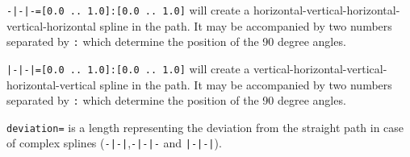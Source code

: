 \documentclass[10pt]{article}
\newenvironment{optionslist}[0]{ 
\begin{list}{}{
	\setlength{\itemindent}{-10pt}
	\setlength{\itemsep}{0pt}
	\setlength{\parsep}{0pt}
}}{\end{list}}
\newcommand\bookmark[1]{\marginpar{\ttfamily #1}}
\begin{document}
\begin{optionslist}
\item \texttt{-|-|-=[0.0 .. 1.0]:[0.0 .. 1.0]} will create a horizontal-vertical-horizontal-vertical-horizontal spline in the path. It may be accompanied by two numbers  separated by \texttt{:} which determine the position of the 90 degree angles.
\item \texttt{|-|-|=[0.0 .. 1.0]:[0.0 .. 1.0]} will create a vertical-horizontal-vertical-horizontal-vertical spline in the path. It may be accompanied by two numbers  separated by \texttt{:} which determine the position of the 90 degree angles.
\item \texttt{deviation=} is a length representing the deviation from the straight path in case of complex splines (\texttt{-|-|},\texttt{-|-|-} and \texttt{|-|-|}).
\end{optionslist}







\end{document}
